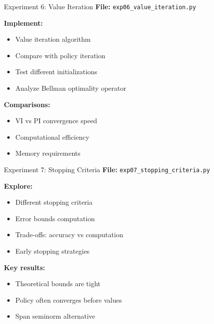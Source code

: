 \documentclass[aspectratio=169,10pt]{beamer}
\begin{document}
\begin{frame}{Experiment 6: Value Iteration}
\textbf{File:} \texttt{exp06\_value\_iteration.py}

\textbf{Implement:}
\begin{itemize}
    \item Value iteration algorithm
    \item Compare with policy iteration
    \item Test different initializations
    \item Analyze Bellman optimality operator
\end{itemize}

\textbf{Comparisons:}
\begin{itemize}
    \item VI vs PI convergence speed
    \item Computational efficiency
    \item Memory requirements
\end{itemize}
\end{frame}

\begin{frame}{Experiment 7: Stopping Criteria}
\textbf{File:} \texttt{exp07\_stopping\_criteria.py}

\textbf{Explore:}
\begin{itemize}
    \item Different stopping criteria
    \item Error bounds computation
    \item Trade-offs: accuracy vs computation
    \item Early stopping strategies
\end{itemize}

\textbf{Key results:}
\begin{itemize}
    \item Theoretical bounds are tight
    \item Policy often converges before values
    \item Span seminorm alternative
\end{itemize}
\end{frame}
\end{document}
